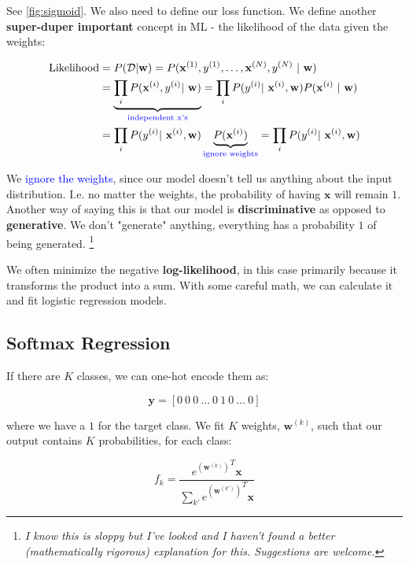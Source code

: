 \documentclass{article}
\newcommand{\vf}[1]{\mathbf{#1}}
\newcommand{\bx}{\vf{x}}
\newcommand{\blue}[1]{\textcolor{blue}{#1}}
\begin{document}
See \autoref{fig:sigmoid}. We also need to define our loss function. We define another \textbf{super-duper important} concept in ML - the likelihood of the data given the weights:

\begin{align*}
    \text{Likelihood} &= P(\mathcal{D} | \vf{w}) = 
        P(\vf{x}^{(1)}, y^{(1)}, \dots, \vf{x}^{(N)}, y^{(N)}\ |\ \vf{w}) \\
    &= \underbrace{\prod_i P(\vf{x}^{(i)}, y^{(i)} |\ \vf{w})}_{\text{\blue{independent x's}}} = \prod_i P(y^{(i)} |\ \vf{x}^{(i)}, \vf{w}) P(\vf{x}^{(i)}\ |\ \vf{w}) \\
    &= \prod_i P(y^{(i)} |\ \vf{x}^{(i)}, \vf{w}) \underbrace{P(\vf{x}^{(i)})}_{\text{\blue{ignore weights}}} = \prod_i P(y^{(i)} |\ \vf{x}^{(i)}, \vf{w})
\end{align*}

We \blue{ignore the weights}, since our model doesn't tell us anything about the input distribution. I.e. no matter the weights, the probability of having $\bx$ will remain $1$. Another way of saying this is that our model is \textbf{discriminative} as opposed to \textbf{generative}. We don't "generate" anything, everything has a probability $1$ of being generated. \footnote{\textit{I know this is sloppy but I've looked and I haven't found a better (mathematically rigorous) explanation for this. Suggestions are welcome.}}
\vskip 0.1in

We often minimize the negative \textbf{log-likelihood}, in this case primarily because it transforms the product into a sum. With some careful math, we can calculate it and fit logistic regression models.

\subsection{Softmax Regression}
If there are $K$ classes, we can one-hot encode them as:

\begin{equation*}
    \vf{y} = [0\ 0\ 0\ \dots\ 0\ 1\ 0\ \dots\ 0]
\end{equation*}

where we have a $1$ for the target class. We fit $K$ weights, $\vf{w}^{(k)}$, such that our output contains $K$ probabilities, for each class:

\begin{equation*}
    f_k = \frac{
        {e^{(\vf{w}^{(k)})}}^T \vf{x}
    }{
        \sum_{k'} {e^{(\vf{w}^{(k')})}}^T \vf{x}
    }
\end{equation*}
\end{document}
